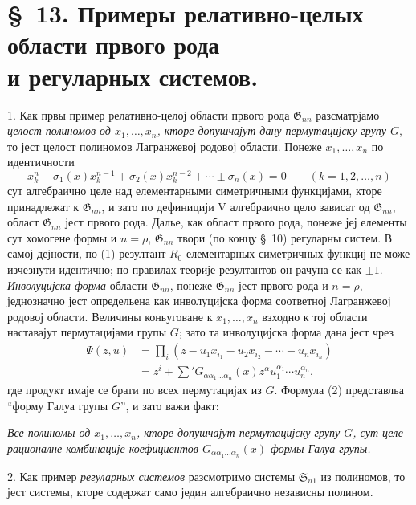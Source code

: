 ﻿\documentclass[11pt]{article}
\providecommand{\Ssys}{\mathfrak{S}}
\providecommand{\Gdom}{\mathfrak{G}}
\begin{document}
\section*{\S\ 13. Примеры релативно-целых области првого рода\\ и регуларных системов.}

1. Как првы пример релативно-целој области првого рода $\Gdom_{nn}$ разсматрјамо {\itshape целост полиномов од $x_1,\ldots,x_n$, кторе допушчајут дану пермутацијску групу $G$}, то јест целост полиномов Лагранжевој родовој области. Понеже $x_1,\ldots,x_n$ по идентичности
\begin{equation}
  x_k^n-\sigma_1(x)x_k^{n-1}+\sigma_2(x)x_k^{n-2}+\cdots\pm\sigma_n(x)=0
  \qquad(k=1,2,\ldots,n)
\tag{1}
\end{equation}
сут алгебраично целе над елементарными симетричными функцијами, кторе принадлежат к $\Gdom_{nn}$, и зато по дефиницији V алгебраично цело зависат од $\Gdom_{nn}$, област $\Gdom_{nn}$ јест првого рода. Далье, как област првого рода, понеже јеј елементы сут хомогене формы и $n=\rho$, $\Gdom_{nn}$ твори (по концу \S\ 10) регуларны систем. В самој дејности, по (1) резултант $R_0$ елементарных симетричных функциј не може изчезнути идентично; по правилах теорије резултантов он рачуна се как $\pm1$. {\itshape Инволуцијска форма} области $\Gdom_{nn}$, понеже $\Gdom_{nn}$ јест првого рода и $n=\rho$, једнозначно јест определьена как инволуцијска форма соответној Лагранжевој родовој области. Величины коньуговане к $x_1,\ldots,x_n$ взходно к тој области наставајут пермутацијами групы $G$; зато та инволуцијска форма дана јест чрез
\begin{equation}
\begin{aligned}
  \Psi(z,u)&=\prod_i
  (z-u_1x_{i_1}-u_2x_{i_2}-\cdots-u_nx_{i_n})\\
  &=z^i+\sum{}'G_{\alpha\alpha_1\ldots\alpha_n}(x)
  z^\alpha u_1^{\alpha_1}\cdots u_n^{\alpha_n},
\end{aligned}
\tag{2}
\end{equation}
где продукт имаје се брати по всех пермутацијах из $G$. Формула (2) представльа ``форму Галуа групы $G$'', и зато важи факт:

{\itshape Все полиномы од $x_1,\ldots,x_n$, кторе допушчајут пермутацијску групу $G$, сут целе рационалне комбинације коефициентов $G_{\alpha\alpha_1\ldots\alpha_n}(x)$ формы Галуа групы.}

2. Как пример {\itshape регуларных системов} разсмотримо системы $\Ssys_{n1}$ из полиномов, то јест системы, кторе содержат само једин алгебраично независны полином.
\end{document}
